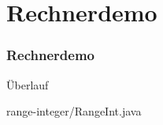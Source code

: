\def\stitle{Rechnerdemo}
\section{\stitle}
\begin{frame}[fragile]%
  \frametitle{\stitle}%
\medskip

\"Uberlauf

{range-integer/RangeInt.java}
\end{frame}